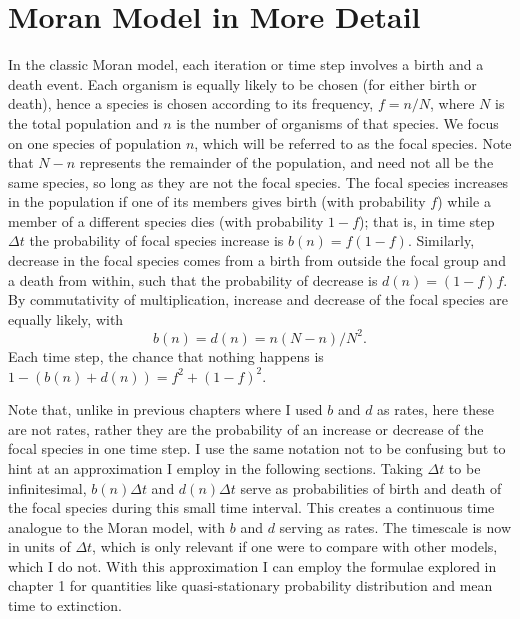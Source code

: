 \section{Moran Model in More Detail}
\fi
In the classic Moran model, each iteration or time step involves a birth and a death event.
Each organism is equally likely to be chosen (for either birth or death), hence a species is chosen according to its frequency, $f=n/N$, where $N$ is the total population and $n$ is the number of organisms of that species.
We focus on one species of population $n$, which will be referred to as the focal species. 
Note that $N-n$ represents the remainder of the population, and need not all be the same species, so long as they are not the focal species. %
The focal species increases in the population if one of its members gives birth (with probability $f$) while a member of a different species dies (with probability $1-f$); that is, in time step $\Delta t$ the probability of focal species increase is $b(n) = f(1-f)$. 
Similarly, decrease in the focal species comes from a birth from outside the focal group and a death from within, such that the probability of decrease is $d(n) = (1-f)f$. 
By commutativity of multiplication, increase and decrease of the focal species are equally likely, with
\begin{equation}
b(n) = d(n) = n(N-n)/N^2.
\end{equation}
Each time step, the chance that nothing happens is $1-\left(b(n)+d(n)\right) = f^2 + (1-f)^2$. 

Note that, unlike in previous chapters where I used $b$ and $d$ as rates, here these are not rates, rather they are the probability of an increase or decrease of the focal species in one time step. 
I use the same notation not to be confusing but to hint at an approximation I employ in the following sections. %
Taking $\Delta t$ to be infinitesimal, $b(n)\Delta t$ and $d(n)\Delta t$ serve as probabilities of birth and death of the focal species during this small time interval. 
This creates a continuous time analogue to the Moran model, with $b$ and $d$ serving as rates. 
The timescale is now in units of $\Delta t$, which is only relevant if one were to compare with other models, which I do not. 
With this approximation I can employ the formulae explored in chapter 1 for quantities like quasi-stationary probability distribution and mean time to extinction. 

